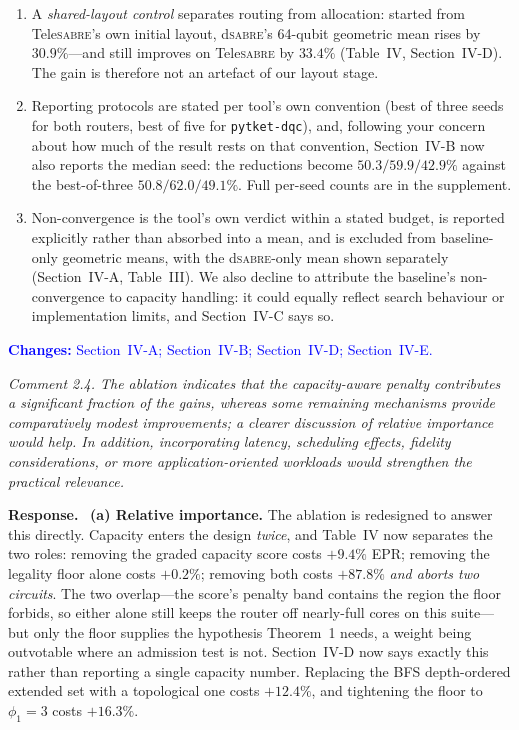 \documentclass[11pt]{article}
\newcommand{\dSABRE}{d\textsc{sabre}}
\newcommand{\TeleSABRE}{Tele\textsc{sabre}}
\newenvironment{comment}{\medskip\noindent\itshape}{\par}
\newcommand{\response}{\smallskip\noindent\textbf{Response.}\ }
\newcommand{\where}[1]{\textcolor{blue}{\textbf{Changes:} #1}}
\begin{document}
\begin{enumerate}[leftmargin=*,itemsep=2pt]
\item A \emph{shared-layout control} separates routing from allocation:
started from \TeleSABRE{}'s own initial layout, \dSABRE{}'s 64-qubit
geometric mean rises by $30.9\%$---and still improves on \TeleSABRE{} by
$33.4\%$ (Table~IV, Section~IV-D). The gain is therefore not an artefact of
our layout stage.
\item Reporting protocols are stated per tool's own convention (best of three
seeds for both routers, best of five for \texttt{pytket-dqc}), and, following
your concern about how much of the result rests on that convention,
Section~IV-B now also reports the median seed: the reductions become
$50.3/59.9/42.9\%$ against the best-of-three $50.8/62.0/49.1\%$. Full per-seed
counts are in the supplement.
\item Non-convergence is the tool's own verdict within a stated budget, is
reported explicitly rather than absorbed into a mean, and is excluded from
baseline-only geometric means, with the \dSABRE{}-only mean shown separately
(Section~IV-A, Table~III). We also decline to attribute the baseline's
non-convergence to capacity handling: it could equally reflect search
behaviour or implementation limits, and Section~IV-C says so.
\end{enumerate}

\where{Section~IV-A; Section~IV-B; Section~IV-D; Section~IV-E.}

\begin{comment}
Comment 2.4. The ablation indicates that the capacity-aware penalty
contributes a significant fraction of the gains, whereas some remaining
mechanisms provide comparatively modest improvements; a clearer discussion of
relative importance would help. In addition, incorporating latency, scheduling
effects, fidelity considerations, or more application-oriented workloads would
strengthen the practical relevance.
\end{comment}

\response
\textbf{(a) Relative importance.} The ablation is redesigned to answer this
directly. Capacity enters the design \emph{twice}, and Table~IV now separates
the two roles: removing the graded capacity score costs $+9.4\%$ EPR;
removing the legality floor alone costs $+0.2\%$; removing both costs
$+87.8\%$ \emph{and aborts two circuits}. The two overlap---the score's penalty band
contains the region the floor forbids, so either alone still keeps the router
off nearly-full cores on this suite---but only the floor supplies the
hypothesis Theorem~1 needs, a weight being outvotable where an admission test
is not. Section~IV-D now says exactly this rather than reporting a single
capacity number. Replacing the
BFS depth-ordered extended set with a topological one costs $+12.4\%$, and
tightening the floor to $\phi_1=3$ costs $+16.3\%$.
\end{document}

